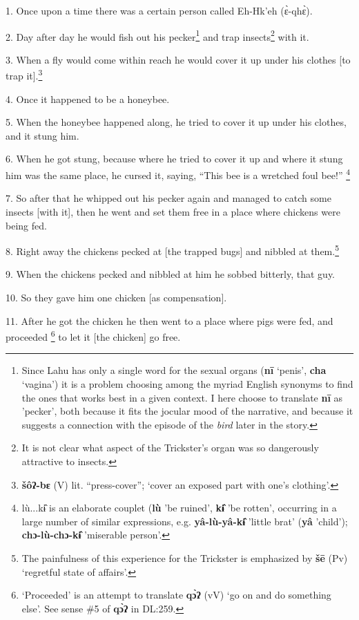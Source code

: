 \setcounter{footnote}{0}

1. Once upon a time there was a certain person called Eh-Hk'eh (ɛ̀-qhɛ̀).

2. Day after day he would fish out his pecker\footnote{Since Lahu has only a single word for the sexual organs (\textbf{nī} `penis', \textbf{cha} `vagina') it is a problem choosing among the myriad English synonyms to find the ones that works best in a given context. I here choose to translate \textbf{nī} as 'pecker', both because it fits the jocular mood of the narrative, and because it suggests a connection with the episode of the \textit{bird} later in the story.} and trap insects\footnote{It is not clear what aspect of the Trickster's organ was so dangerously attractive to insects.} with it.

3. When a fly would come within reach he would cover it up under his clothes [to
trap it].\footnote{\textbf{šôʔ-bɛ} (V) lit. ``press-cover''; `cover an exposed part with one's clothing'.}

4. Once it happened to be a honeybee.

5. When the honeybee happened along, he tried to cover it up under his clothes,
and it stung him.

6. When he got stung, because where he tried to cover it up and where it stung
him was the same place, he cursed it, saying, ``This bee is a wretched foul bee!''
\footnote{lù...kɨ̂ is an elaborate couplet (\textbf{lù} 'be ruined', \textbf{kɨ̂} 'be rotten', occurring in a large number of similar expressions, e.g. \textbf{yâ-lù-yâ-kɨ̂} 'little brat' (\textbf{yâ} 'child'); \textbf{chɔ-lù-chɔ-kɨ̂} 'miserable person'.}

7. So after that he whipped out his pecker again and managed to catch some insects
[with it], then he went and set them free in a place where chickens were being
fed.

8. Right away the chickens pecked at [the trapped bugs] and nibbled at them.\footnote{The painfulness of this experience for the Trickster is emphasized by \textbf{šē} (Pv) `regretful state of affairs'.}

9. When the chickens pecked and nibbled at him he sobbed bitterly, that guy.

10. So they gave him one chicken [as compensation].

11. After he got the chicken he then went to a place where pigs were fed, and proceeded
\footnote{`Proceeded' is an attempt to translate \textbf{qɔ̀ʔ} (vV) `go on and do something else'. See sense \#5 of \textbf{qɔ̀ʔ} in DL:259.} to let it [the chicken] go free.

